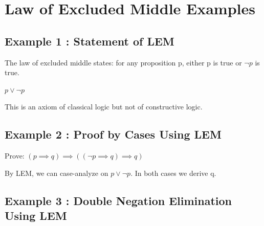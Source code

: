 \documentclass[a4paper,10pt,fleqn]{article}
\begin{document}
\section*{Law of Excluded Middle Examples}

\subsection*{Example 1 : Statement of LEM}

\noindent The law of excluded middle states: for any proposition p, either p is true or $\lnot p$ is true.

\bigskip

\noindent
$p \lor \lnot p$


\noindent This is an axiom of classical logic but not of constructive logic.

\bigskip

\subsection*{Example 2 : Proof by Cases Using LEM}

\noindent Prove: $(p \implies q) \implies ((\lnot p \implies q) \implies q)$

\bigskip

\begin{center}
\end{center}
\bigskip

\noindent By LEM, we can case-analyze on $p \lor \lnot p$. In both cases we derive q.

\bigskip

\subsection*{Example 3 : Double Negation Elimination Using LEM}
\end{document}

